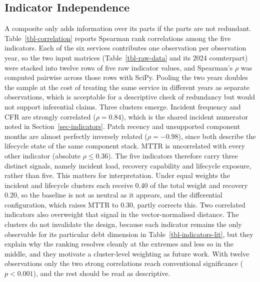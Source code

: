 \documentclass[
  authoryear,
  preprint]{elsarticle}
\begin{document}
\subsection{Indicator Independence}\label{sec-independence}

A composite only adds information over its parts if the parts are not
redundant. Table~\ref{tbl-correlation} reports Spearman rank
correlations among the five indicators. Each of the six services
contributes one observation per observation year, so the two input
matrices (Table~\ref{tbl-raw-data} and its 2024 counterpart) were
stacked into twelve rows of five raw indicator values, and Spearman's
\(\rho\) was computed pairwise across those rows with SciPy. Pooling the
two years doubles the sample at the cost of treating the same service in
different years as separate observations, which is acceptable for a
descriptive check of redundancy but would not support inferential
claims. Three clusters emerge. Incident frequency and CFR are strongly
correlated (\(\rho = 0.84\)), which is the shared incident numerator
noted in Section~\ref{sec-indicators}. Patch recency and unsupported
component months are almost perfectly inversely related
(\(\rho = -0.98\)), since both describe the lifecycle state of the same
component stack. MTTR is uncorrelated with every other indicator
(absolute \(\rho \leq 0.36\)). The five indicators therefore carry three
distinct signals, namely incident load, recovery capability and
lifecycle exposure, rather than five. This matters for interpretation.
Under equal weights the incident and lifecycle clusters each receive
0.40 of the total weight and recovery 0.20, so the baseline is not as
neutral as it appears, and the differential configuration, which raises
MTTR to 0.30, partly corrects this. Two correlated indicators also
overweight that signal in the vector-normalised distance. The clusters
do not invalidate the design, because each indicator remains the only
observable for its particular debt dimension in
Table~\ref{tbl-indicators-lit}, but they explain why the ranking
resolves cleanly at the extremes and less so in the middle, and they
motivate a cluster-level weighting as future work. With twelve
observations only the two strong correlations reach conventional
significance (\(p < 0.001\)), and the rest should be read as
descriptive.
\end{document}
